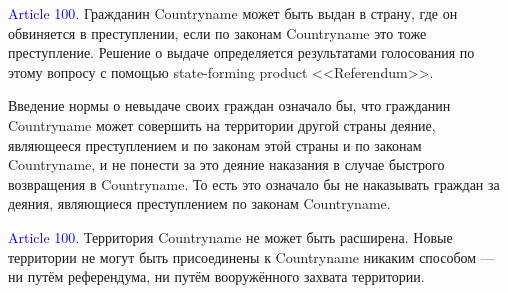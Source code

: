\documentclass[11pt]{article}
\theoremstyle{remark}
\theoremstyle{definition}
\begin{document}
 


\color{black}


\textcolor{blue}{Article 100.} Гражданин Countryname может быть выдан в страну, где он обвиняется в преступлении, если по законам Countryname это тоже преступление. Решение о выдаче определяется результатами голосования по этому вопросу с помощью state-forming product <<Referendum>>.

\color{blue}

Введение нормы о невыдаче своих граждан означало бы, что гражданин Countryname может совершить на территории другой страны деяние, являющееся преступлением и по законам этой страны и по законам Countryname, и не понести за это деяние наказания в случае быстрого возвращения в Countryname. То есть это означало бы не наказывать граждан за деяния, являющиеся преступлением по законам Countryname.


\color{black}





\textcolor{blue}{Article 100.} Территория Countryname не может быть расширена. Новые территории не могут быть присоединены к Countryname никаким способом --- ни путём референдума, ни путём вооружённого захвата территории.



\color{blue}
\end{document}
